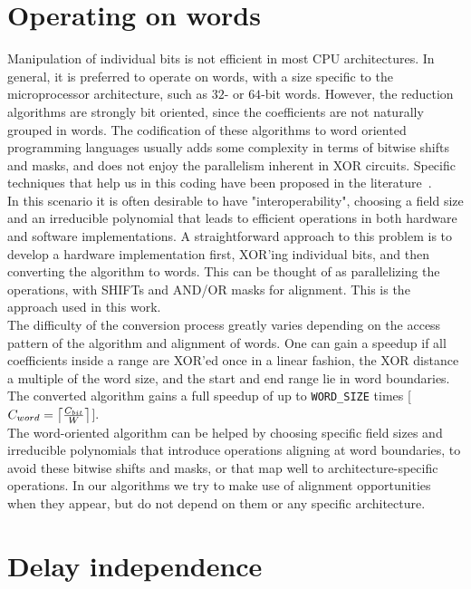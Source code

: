 \section{Operating on words}\label{operating-on-words}

Manipulation of individual bits is not efficient in most CPU architectures. In general, it is preferred to operate on words, with a size specific to the microprocessor architecture, such as $32$- or $64$-bit words. However, the reduction algorithms are strongly bit oriented, since the coefficients are not naturally grouped in words. The codification of these algorithms to word oriented programming languages usually adds some complexity in terms of bitwise shifts and masks, and does not enjoy the parallelism inherent in XOR circuits. Specific techniques that help us in this coding have been proposed in the literature~\cite{hilewitz2008advanced}.  \\

In this scenario it is often desirable to have "interoperability", choosing a field size and an irreducible polynomial that leads to efficient operations in both hardware and software implementations. A straightforward approach to this problem is to develop a hardware implementation first, XOR'ing individual bits, and then converting the algorithm to words. This can be thought of as parallelizing the operations, with SHIFTs and AND/OR masks for alignment. This is the approach used in this work. \\

The difficulty of the conversion process greatly varies depending on the access pattern of the algorithm and alignment of words. One can gain a speedup if all coefficients inside a range are XOR'ed once in a linear fashion, the XOR distance a multiple of the word size, and the start and end range lie in word boundaries. The converted algorithm gains a full speedup of up to \texttt{WORD\_SIZE} times {[}$C_{word} = \ceil*{\frac{C_{bit}}{W}}${]}. \\

The word-oriented algorithm can be helped by choosing specific field sizes and irreducible polynomials that introduce operations aligning at word boundaries, to avoid these bitwise shifts and masks, or that map well to architecture-specific operations. In our algorithms we try to make use of alignment opportunities when they appear, but do not depend on them or any specific architecture. \\

\section{Delay independence}\label{delay-independence}

